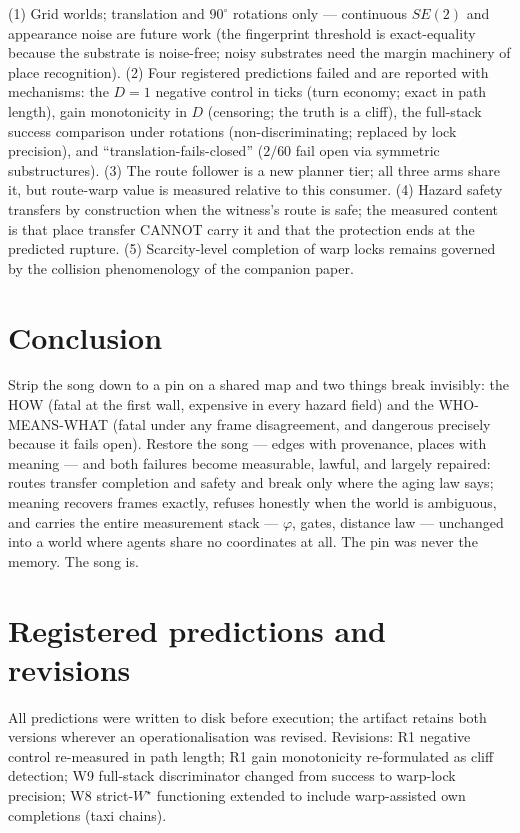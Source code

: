 \documentclass{article}
\newcommand{\wstar}{W^{\star}}
\begin{document}
(1) Grid worlds; translation and $90^\circ$ rotations only ---
continuous $SE(2)$ and appearance noise are future work (the
fingerprint threshold is exact-equality because the substrate is
noise-free; noisy substrates need the margin machinery of place
recognition). (2) Four registered predictions failed and are reported
with mechanisms: the $D{=}1$ negative control in ticks (turn economy;
exact in path length), gain monotonicity in $D$ (censoring; the truth
is a cliff), the full-stack success comparison under rotations
(non-discriminating; replaced by lock precision), and
``translation-fails-closed'' ($2/60$ fail open via symmetric
substructures). (3) The route follower is a new planner tier; all
three arms share it, but route-warp value is measured relative to
this consumer. (4) Hazard safety transfers by construction when the
witness's route is safe; the measured content is that place transfer
CANNOT carry it and that the protection ends at the predicted
rupture. (5) Scarcity-level completion of warp locks remains governed
by the collision phenomenology of the companion paper.

\section{Conclusion}

Strip the song down to a pin on a shared map and two things break
invisibly: the HOW (fatal at the first wall, expensive in every
hazard field) and the WHO-MEANS-WHAT (fatal under any frame
disagreement, and dangerous precisely because it fails open). Restore
the song --- edges with provenance, places with meaning --- and both
failures become measurable, lawful, and largely repaired: routes
transfer completion and safety and break only where the aging law
says; meaning recovers frames exactly, refuses honestly when the
world is ambiguous, and carries the entire measurement stack ---
$\varphi$, gates, distance law --- unchanged into a world where
agents share no coordinates at all. The pin was never the memory.
The song is.

\appendix

\section{Registered predictions and revisions}
\label{app:registered}
All predictions were written to disk before execution; the artifact
retains both versions wherever an operationalisation was revised.
Revisions: R1 negative control re-measured in path length; R1 gain
monotonicity re-formulated as cliff detection; W9 full-stack
discriminator changed from success to warp-lock precision; W8
strict-$\wstar$ functioning extended to include warp-assisted own
completions (taxi chains). %
\end{document}
